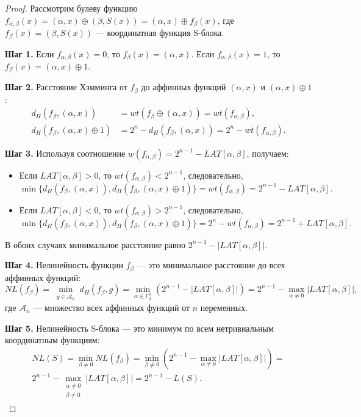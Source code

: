 \begin{proof}
Рассмотрим булеву функцию $f_{\alpha, \beta}(x) = (\alpha, x) \oplus (\beta, S(x)) = (\alpha, x) \oplus f_\beta(x)$, где $f_\beta(x) = (\beta, S(x))$ — координатная функция S-блока.

\textbf{Шаг 1.} Если $f_{\alpha, \beta}(x) = 0$, то $f_\beta(x) = (\alpha, x)$. Если $f_{\alpha, \beta}(x) = 1$, то $f_\beta(x) = (\alpha, x) \oplus 1$.

\textbf{Шаг 2.} Расстояние Хэмминга от $f_\beta$ до аффинных функций $(\alpha, x)$ и $(\alpha, x) \oplus 1$:
\begin{align*}
    d_H(f_\beta, (\alpha, x)) &= wt(f_\beta \oplus (\alpha, x)) = wt(f_{\alpha, \beta}), \\
    d_H(f_\beta, (\alpha, x) \oplus 1) &= 2^n - d_H(f_\beta, (\alpha, x)) = 2^n - wt(f_{\alpha, \beta}).
\end{align*}

\textbf{Шаг 3.} Используя соотношение $w(f_{\alpha, \beta}) = 2^{n-1} - LAT[\alpha, \beta]$, получаем:
\begin{itemize}
    \item Если $LAT[\alpha, \beta] > 0$, то $wt(f_{\alpha, \beta}) < 2^{n-1}$, следовательно,
    \[
        \min\{d_H(f_\beta, (\alpha, x)), d_H(f_\beta, (\alpha, x) \oplus 1)\} = wt(f_{\alpha, \beta}) = 2^{n-1} - LAT[\alpha, \beta].
    \]
    
    \item Если $LAT[\alpha, \beta] < 0$, то $wt(f_{\alpha, \beta}) > 2^{n-1}$, следовательно,
    \[
        \min\{d_H(f_\beta, (\alpha, x)), d_H(f_\beta, (\alpha, x) \oplus 1)\} = 2^n - wt(f_{\alpha, \beta}) = 2^{n-1} + LAT[\alpha, \beta].
    \]
\end{itemize}

В обоих случаях минимальное расстояние равно $2^{n-1} - |LAT[\alpha, \beta]|$.

\textbf{Шаг 4.} Нелинейность функции $f_\beta$ — это минимальное расстояние до всех аффинных функций:
\[
    NL(f_\beta) = \min_{\substack{g \in \mathcal{A}_n}} d_H(f_\beta, g) = \min_{\alpha \in \mathbb{F}_2^n} \left(2^{n-1} - |LAT[\alpha, \beta]|\right) = 2^{n-1} - \max_{\alpha \neq 0} |LAT[\alpha, \beta]|,
\]
где $\mathcal{A}_n$ — множество всех аффинных функций от $n$ переменных.

\textbf{Шаг 5.} Нелинейность S-блока — это минимум по всем нетривиальным координатным функциям:
\begin{equation*}
\begin{aligned}
    NL(S) = \min_{\beta \neq 0} NL(f_\beta) = \min_{\beta \neq 0} \left(2^{n-1} - \max_{\alpha \neq 0} |LAT[\alpha, \beta]|\right) = \\
    2^{n-1} - \max_{\substack{\alpha \neq 0 \\ \beta \neq 0}} |LAT[\alpha, \beta]| = 2^{n-1} - L(S).
\end{aligned}
\end{equation*}
\end{proof}

